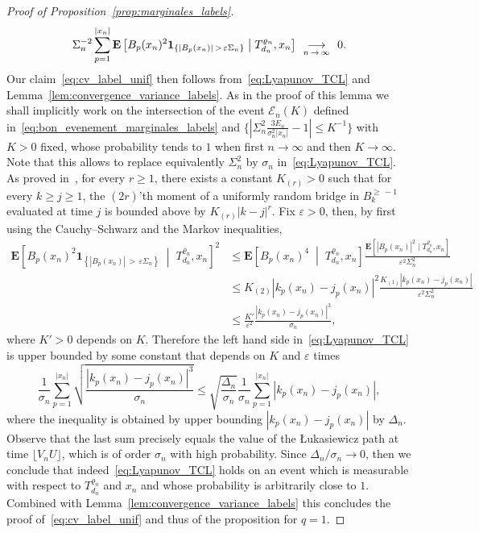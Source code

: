 \documentclass[10pt]{amsart}
\theoremstyle{definition}\newtheorem{defi}[theo]{Definition}\newtheorem{rema}[theo]{Remark}\newtheorem{exam}[theo]{Example}\newtheorem{exem}[theo]{Example}\newtheorem{nota}[theo]{Notation}
\newcommand{\ensembles}[1]{\mathbf{#1}}
\newcommand{\E}{\ensembles{E}}
\newcommand{\Esc}[2]{\E\left[#1 \;\middle|\; #2\right]}
\newcommand{\1}{\ensembles{1}}
\renewcommand{\le}{\leqslant}
\renewcommand{\ge}{\geqslant}
\newcommand{\BBmap}{B}
\newcommand{\clE}{\mathcal{E}}
\newcommand{\fn}{T_{d_n}^{\varrho_n}}
\newcommand{\edges}{E}
\newcommand{\vertices}{V}
\newcommand{\cv}[1][n]{\enskip\mathop{\longrightarrow}^{}_{#1\,\to\,\infty}\enskip}
\providecommand{\?}{}
\begin{document}
\begin{proof}[Proof of Proposition~\ref{prop:marginales_labels}]
\begin{equation}\label{eq:Lyapunov_TCL}
\Sigma_n^{-2} \sum_{p=1}^{|x_n|} \Esc{B_p(x_n)^2 \1_{\left\{\left|B_p(x_n)\right|\,>\,\varepsilon \Sigma_n\right\}}}{\fn, x_n} \cv 0.
\end{equation}
Our claim~\eqref{eq:cv_label_unif} then follows from~\eqref{eq:Lyapunov_TCL} and Lemma~\ref{lem:convergence_variance_labels}. As in the proof of this lemma we shall implicitly work on the intersection of the event $\clE_n(K)$ defined in~\eqref{eq:bon_evenement_marginales_labels} and $\{|\Sigma_n^2 \frac{3 \edges_n}{\sigma_n^2 |x_n|} - 1|\le K^{-1}\}$ with $K>0$ fixed, whose probability tends to $1$ when first $n\to\infty$ and then $K\to\infty$. Note that this allows to replace equivalently $\Sigma^2_n$ by $\sigma_n$ in~\eqref{eq:Lyapunov_TCL}. As proved in~\cite[Lemma~1]{LGM11}, for every $r \ge 1$, there exists a constant $K_{(r)} > 0$ such that for every $k \ge j \ge 1$, the $(2r)$'th moment of a uniformly random bridge in $\BBmap_k^{\ge\,-1}$ evaluated at time $j$ is bounded above by $K_{(r)} |k-j|^r$. Fix $\varepsilon > 0$, then, by first using the Cauchy--Schwarz and the Markov inequalities,
\begin{align*}
\Esc{B_p(x_n)^2 \1_{\left\{\left|B_p(x_n)\right|\,>\, \varepsilon \Sigma_n\right\}}}{\fn, x_n}^2 &\le \Esc{B_p(x_n)^4}{\fn, x_n} \frac{\E\left[\left|B_p(x_n)\right|^2 \mid \fn, x_n\right]}{\varepsilon^2 \Sigma_n^2}
\\
&\le K_{(2)} \left|k_p(x_n)-j_p(x_n)\right|^2 \frac{K_{(1)} \left|k_p(x_n)-j_p(x_n)\right|}{\varepsilon^2 \Sigma_n^2}
\\
&\le \frac{K'}{\varepsilon^2} \frac{\left|k_p(x_n)-j_p(x_n)\right|^3}{\sigma_n},
\end{align*}
where $K' > 0$ depends on $K$. Therefore the left hand side in~\eqref{eq:Lyapunov_TCL} is upper bounded by some constant that depends on $K$ and $\varepsilon$ times
\[
\frac{1}{\sigma_n} \sum_{p=1}^{|x_n|} \sqrt{\frac{\left|k_p(x_n)-j_p(x_n)\right|^3}{\sigma_n}}
\le \sqrt{\frac{\Delta_n}{\sigma_n}} \frac{1}{\sigma_n} \sum_{p=1}^{|x_n|} \left|k_p(x_n)-j_p(x_n)\right|,
\]
where the inequality is obtained by upper bounding $|k_p(x_n)-j_p(x_n)|$ by $\Delta_n$. Observe that the last sum precisely equals the value of the {\L}ukasiewicz path at time $\lfloor \vertices_n U \rfloor$, which is of order $\sigma_n$ with high probability. Since $\Delta_n/\sigma_n \to 0$, then we conclude that indeed~\eqref{eq:Lyapunov_TCL} holds on an event which is measurable with respect to $\fn$ and $x_n$ and whose probability is arbitrarily close to $1$. Combined with Lemma~\ref{lem:convergence_variance_labels} this concludes the proof of~\eqref{eq:cv_label_unif} and thus of the proposition for $q=1$.



\end{proof}
\end{document}

